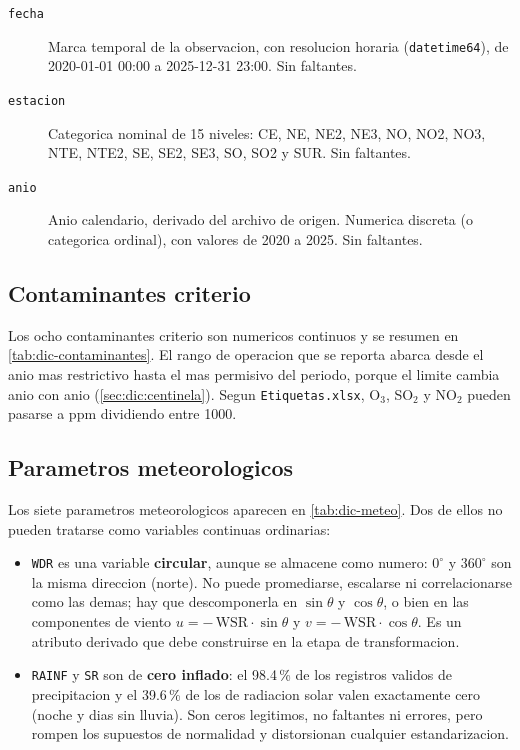 \begin{description}
  \item[\texttt{fecha}] Marca temporal de la observacion, con resolucion
    horaria (\texttt{datetime64}), de 2020-01-01 00:00 a 2025-12-31 23:00. Sin
    faltantes.
  \item[\texttt{estacion}] Categorica nominal de 15 niveles: CE, NE, NE2, NE3,
    NO, NO2, NO3, NTE, NTE2, SE, SE2, SE3, SO, SO2 y SUR. Sin faltantes.
  \item[\texttt{anio}] Anio calendario, derivado del archivo de origen.
    Numerica discreta (o categorica ordinal), con valores de 2020 a 2025. Sin
    faltantes.
\end{description}

\subsection{Contaminantes criterio}\label{sec:dic:contaminantes}

Los ocho contaminantes criterio son numericos continuos y se resumen en
\cref{tab:dic-contaminantes}. El rango de operacion que se reporta abarca desde
el anio mas restrictivo hasta el mas permisivo del periodo, porque el limite
cambia anio con anio (\cref{sec:dic:centinela}). Segun \texttt{Etiquetas.xlsx},
O$_3$, SO$_2$ y NO$_2$ pueden pasarse a ppm dividiendo entre 1000.

\subsection{Parametros meteorologicos}\label{sec:dic:meteorologicos}

Los siete parametros meteorologicos aparecen en \cref{tab:dic-meteo}. Dos de
ellos no pueden tratarse como variables continuas ordinarias:

\begin{itemize}
  \item \texttt{WDR} es una variable \textbf{circular}, aunque se almacene como
    numero: $0^{\circ}$ y $360^{\circ}$ son la misma direccion (norte). No
    puede promediarse, escalarse ni correlacionarse como las demas; hay que
    descomponerla en $\sin\theta$ y $\cos\theta$, o bien en las componentes de
    viento $u = -\,\mathrm{WSR}\cdot\sin\theta$ y
    $v = -\,\mathrm{WSR}\cdot\cos\theta$. Es un atributo derivado que debe
    construirse en la etapa de transformacion.
  \item \texttt{RAINF} y \texttt{SR} son de \textbf{cero inflado}: el 98.4\,\%
    de los registros validos de precipitacion y el 39.6\,\% de los de radiacion
    solar valen exactamente cero (noche y dias sin lluvia). Son ceros
    legitimos, no faltantes ni errores, pero rompen los supuestos de normalidad
    y distorsionan cualquier estandarizacion.
\end{itemize}


